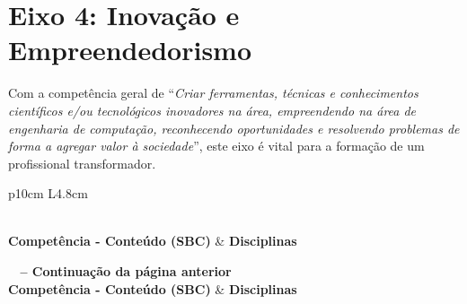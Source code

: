\section*{Eixo  4: Inovação e Empreendedorismo}
Com a competência geral de ``\textit{Criar ferramentas, técnicas e conhecimentos científicos e/ou tecnológicos inovadores na área, empreendendo na área de engenharia de computação, reconhecendo oportunidades e resolvendo problemas de forma a agregar valor à sociedade}'', este eixo é vital para a formação de um profissional transformador.

\begin{small}
    \begin{longtable}{p{10cm} L{4.8cm}}
        \caption{Relação entre as competências do Eixo 4 da SBC e as disciplinas do curso} \label{eixo1} \\
        \toprule
        \textbf{Competência - Conteúdo (SBC)}              & \textbf{Disciplinas}                        \\
        \midrule
        \endfirsthead

        {{\bfseries \tablename\ \thetable{} -- Continuação da página anterior}}                          \\
        \toprule
        \textbf{Competência - Conteúdo (SBC)}              & \textbf{Disciplinas}                        \\
        \midrule
        \endhead

        \midrule {}                                        \\
        \endfoot


\end{longtable}
\end{small}
